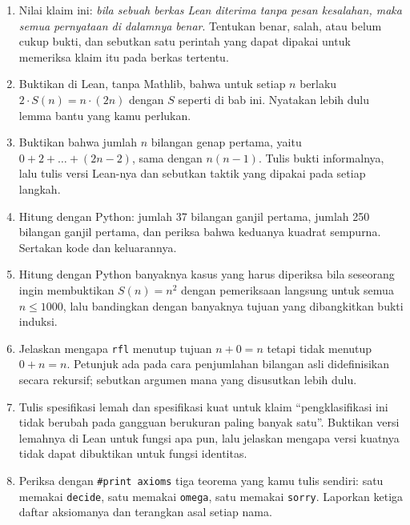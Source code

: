 \begin{latihan}
\begin{enumerate}
  \item Nilai klaim ini: \emph{bila sebuah berkas Lean diterima tanpa pesan kesalahan, maka semua
        pernyataan di dalamnya benar}. Tentukan benar, salah, atau belum cukup bukti, dan sebutkan
        satu perintah yang dapat dipakai untuk memeriksa klaim itu pada berkas tertentu.

  \item Buktikan di Lean, tanpa Mathlib, bahwa untuk setiap $n$ berlaku $2\cdot S(n)=n\cdot(2n)$
        dengan $S$ seperti di bab ini. Nyatakan lebih dulu lemma bantu yang kamu perlukan.

  \item Buktikan bahwa jumlah $n$ bilangan genap pertama, yaitu $0+2+\dots+(2n-2)$, sama dengan
        $n(n-1)$. Tulis bukti informalnya, lalu tulis versi Lean-nya dan sebutkan taktik yang
        dipakai pada setiap langkah.

  \item Hitung dengan Python: jumlah 37 bilangan ganjil pertama, jumlah 250 bilangan ganjil
        pertama, dan periksa bahwa keduanya kuadrat sempurna. Sertakan kode dan keluarannya.

  \item Hitung dengan Python banyaknya kasus yang harus diperiksa bila seseorang ingin membuktikan
        $S(n)=n^{2}$ dengan pemeriksaan langsung untuk semua $n\le 1000$, lalu bandingkan dengan
        banyaknya tujuan yang dibangkitkan bukti induksi.

  \item Jelaskan mengapa \texttt{rfl} menutup tujuan $n+0=n$ tetapi tidak menutup $0+n=n$. Petunjuk
        ada pada cara penjumlahan bilangan asli didefinisikan secara rekursif; sebutkan argumen
        mana yang disusutkan lebih dulu.

  \item Tulis spesifikasi lemah dan spesifikasi kuat untuk klaim ``pengklasifikasi ini tidak
        berubah pada gangguan berukuran paling banyak satu''. Buktikan versi lemahnya di Lean
        untuk fungsi apa pun, lalu jelaskan mengapa versi kuatnya tidak dapat dibuktikan untuk
        fungsi identitas.

  \item Periksa dengan \texttt{\#print axioms} tiga teorema yang kamu tulis sendiri: satu memakai
        \texttt{decide}, satu memakai \texttt{omega}, satu memakai \texttt{sorry}. Laporkan
        ketiga daftar aksiomanya dan terangkan asal setiap nama.


\end{enumerate}
\end{latihan}
